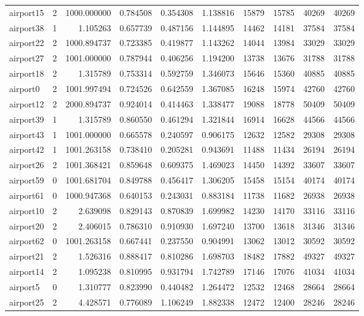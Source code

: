 \begin{longtable}{|l|r|r|r|r|r|r|r|r|r|}
airport15 & 2 & 1000.000000 & 0.784508 & 0.354308 & 1.138816 & 15879 & 15785 & 40269 & 40269 \\
airport38 & 1 & 1.105263 & 0.657739 & 0.487156 & 1.144895 & 14462 & 14181 & 37584 & 37584 \\
airport22 & 2 & 1000.894737 & 0.723385 & 0.419877 & 1.143262 & 14044 & 13984 & 33029 & 33029 \\
airport27 & 2 & 1001.000000 & 0.787944 & 0.406256 & 1.194200 & 13738 & 13676 & 31788 & 31788 \\
airport18 & 2 & 1.315789 & 0.753314 & 0.592759 & 1.346073 & 15646 & 15360 & 40885 & 40885 \\
airport0 & 2 & 1001.997494 & 0.724526 & 0.642559 & 1.367085 & 16248 & 15974 & 42760 & 42760 \\
airport12 & 2 & 2000.894737 & 0.924014 & 0.414463 & 1.338477 & 19088 & 18778 & 50409 & 50409 \\
airport39 & 1 & 1.315789 & 0.860550 & 0.461294 & 1.321844 & 16914 & 16628 & 44566 & 44566 \\
airport43 & 1 & 1001.000000 & 0.665578 & 0.240597 & 0.906175 & 12632 & 12582 & 29308 & 29308 \\
airport42 & 1 & 1001.263158 & 0.738410 & 0.205281 & 0.943691 & 11488 & 11434 & 26194 & 26194 \\
airport26 & 2 & 1001.368421 & 0.859648 & 0.609375 & 1.469023 & 14450 & 14392 & 33607 & 33607 \\
airport59 & 0 & 1001.681704 & 0.849788 & 0.456417 & 1.306205 & 15458 & 15154 & 40174 & 40174 \\
airport61 & 0 & 1000.947368 & 0.640153 & 0.243031 & 0.883184 & 11738 & 11682 & 26938 & 26938 \\
airport10 & 2 & 2.639098 & 0.829143 & 0.870839 & 1.699982 & 14230 & 14170 & 33116 & 33116 \\
airport20 & 2 & 2.406015 & 0.786310 & 0.910930 & 1.697240 & 13700 & 13618 & 31346 & 31346 \\
airport62 & 0 & 1001.263158 & 0.667441 & 0.237550 & 0.904991 & 13062 & 13012 & 30592 & 30592 \\
airport21 & 2 & 1.526316 & 0.888417 & 0.810286 & 1.698703 & 18482 & 17882 & 49327 & 49327 \\
airport14 & 2 & 1.095238 & 0.810995 & 0.931794 & 1.742789 & 17146 & 17076 & 41034 & 41034 \\
airport5 & 0 & 1.310777 & 0.823990 & 0.440482 & 1.264472 & 12532 & 12468 & 28664 & 28664 \\
airport25 & 2 & 4.428571 & 0.776089 & 1.106249 & 1.882338 & 12472 & 12400 & 28246 & 28246 \\

\end{longtable}
